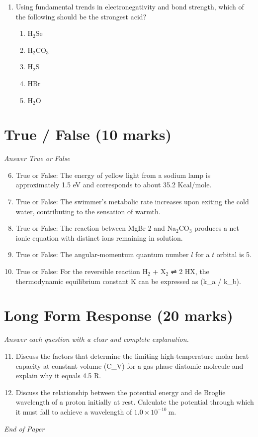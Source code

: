 \documentclass[12pt]{article}
\begin{document}
\begin{enumerate}[label=\arabic*.]
\begin{enumerate}[label=(\alph*)]
    \item often very reactive with water
\end{enumerate}
\item Using fundamental trends in electronegativity and bond strength, which of the following should be the strongest acid?
\begin{enumerate}[label=(\alph*)]
    \item H$_{2}$Se
    \item H$_{2}$CO$_{3}$
    \item H$_{2}$S
    \item HBr
    \item H$_{2}$O
\end{enumerate}
\end{enumerate}

\section*{True / False (10 marks)}
\textit{Answer True or False}
\begin{enumerate}[label=\arabic*.]
\setcounter{enumi}{5}
\item True or False: The energy of yellow light from a sodium lamp is approximately 1.5 eV and corresponds to about 35.2 Kcal/mole.
\item True or False: The swimmer's metabolic rate increases upon exiting the cold water, contributing to the sensation of warmth.
\item True or False: The reaction between MgBr 2 and Na$_{2}$CO$_{3}$ produces a net ionic equation with distinct ions remaining in solution.
\item True or False: The angular-momentum quantum number $l$ for a $t$ orbital is 5.
\item True or False: For the reversible reaction H$_{2}$ + X$_{2}$ ⇌ 2 HX, the thermodynamic equilibrium constant K can be expressed as (k\_a / k\_b).
\end{enumerate}

\section*{Long Form Response (20 marks)}
\textit{Answer each question with a clear and complete explanation.}
\begin{enumerate}[label=\arabic*.]
\setcounter{enumi}{10}
\item Discuss the factors that determine the limiting high-temperature molar heat capacity at constant volume (C\_V) for a gas-phase diatomic molecule and explain why it equals 4.5 R.
\item Discuss the relationship between the potential energy and de Broglie wavelength of a proton initially at rest. Calculate the potential through which it must fall to achieve a wavelength of \(1.0 \times 10^{-10} \mathrm{~m}\).
\end{enumerate}

\vfill
\noindent\textit{End of Paper}
\end{document}
